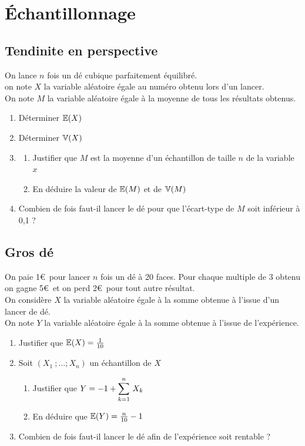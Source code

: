 \documentclass[oneside,12pt]{book}          %
\begin{document}
\section{Échantillonnage}

\subsection{Tendinite en perspective}
On lance $n$ fois un dé cubique parfaitement équilibré.\\
on note $X$ la variable aléatoire égale au numéro obtenu lors d'un lancer.\\
On note $M$ la variable aléatoire égale à la moyenne de tous les résultats obtenus.
\begin{enumerate}
    \item Déterminer ${\mathbb E}(X)$
    \item Déterminer ${\mathbb V}(X)$
    \item \begin{enumerate}
    	\item Justifier que $M$ est la moyenne d'un échantillon de taille $n$ de la variable $x$
    	\item En déduire la valeur de ${\mathbb E}(M)$ et de ${\mathbb V}(M)$
    \end{enumerate}    
    \item Combien de fois faut-il lancer le dé pour que l'écart-type de $M$ soit inférieur à 0,1 ?
\end{enumerate} 



\subsection{Gros dé}
On paie 1\euro\, pour lancer $n$ fois un dé à 20 faces. Pour chaque multiple de 3 obtenu on gagne 5\euro\, et on perd 2\euro\, pour tout autre résultat.\\
On considère $X$ la variable aléatoire égale à la somme obtenue à l'issue d'un lancer de dé.\\
On note $Y$ la variable aléatoire égale à la somme obtenue à l'issue de l'expérience.
\begin{enumerate}
	\item Justifier que ${\mathbb E}(X)=\frac{1}{10}$
	\item Soit $(X_1~; \ldots ; X_n)$ un échantillon de $X$
	\begin{enumerate}
		\item Justifier que $Y=-1+{\displaystyle\sum_{k=1}^{n}}~X_k$
		\item En déduire que ${\mathbb E}(Y)=\frac{n}{10}-1$
	\end{enumerate}
	\item Combien de fois faut-il lancer le dé afin de l'expérience soit rentable ?
\end{enumerate}
\end{document}
